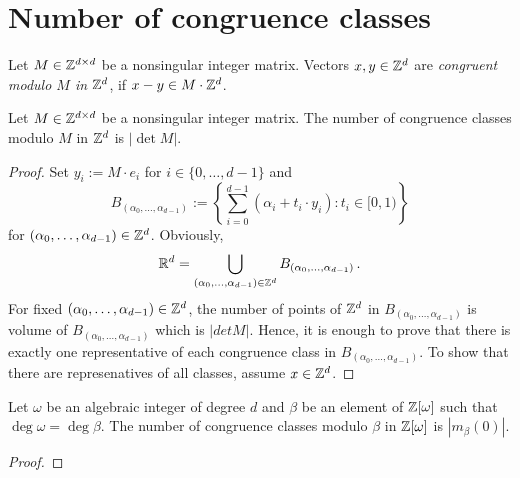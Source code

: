\section{Number of congruence classes}

\begin{defn}
Let $M\in\mathbb{Z}^{d\times d}$ be a nonsingular integer matrix. Vectors $x,y \in \mathbb{Z}^d$ are \emph{congruent modulo $M$ in $\mathbb{Z}^d$}, if $x-y \in M\cdot\mathbb{Z}^d$.
\end{defn}

\begin{lem}
Let $M\in\mathbb{Z}^{d\times d}$ be a nonsingular integer matrix. The number of congruence classes modulo $M$ in $\mathbb{Z}^d$ is $|\det M|$.
\end{lem}
\begin{proof}
Set $y_i:=M\cdot e_i$ for $i\in\{0, \dots, d-1 \}$ and 
$$
B_{(\alpha_0, \dots, \alpha_{d-1})}:=\left\{\sum_{i=0}^{d-1} (\alpha_i + t_i\cdot y_i) \colon t_i \in [0,1)\right\}
$$
for $(\alpha_0, \dots, \alpha_{d-1}) \in \mathbb{Z}^d$. Obviously,
$$
\mathbb{R}^d=\bigcup_{(\alpha_0, \dots, \alpha_{d-1}) \in \mathbb{Z}^d} B_{(\alpha_0, \dots, \alpha_{d-1})}\,.
$$
For fixed $(\alpha_0, \dots, \alpha_{d-1}) \in \mathbb{Z}^d$, the number of points of $\mathbb{Z}^d$ in $B_{(\alpha_0, \dots, \alpha_{d-1})}$  is volume of $B_{(\alpha_0, \dots, \alpha_{d-1})}$  which is $|det M|$. Hence, it is enough to prove that there is exactly one representative of each congruence class in $B_{(\alpha_0, \dots, \alpha_{d-1})}$. To show that there are represenatives of all classes, assume $x\in\mathbb{Z}^d$.
\end{proof}

\begin{thm}
Let $\omega$ be an algebraic integer of degree $d$ and  $\beta$ be an element of $\mathbb{Z}[\omega]$ such that $\deg \omega = \deg\beta$. The number of congruence classes modulo $\beta$ in $\mathbb{Z}[\omega]$ is $|m_\beta(0)|$.
\end{thm}
\begin{proof}
\end{proof}